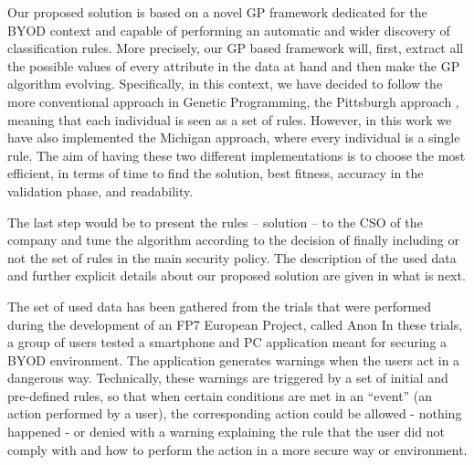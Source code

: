 \documentclass[runningheads]{llncs}
\begin{document}
Our proposed solution is based on a novel GP framework dedicated for
the BYOD context and capable of performing an automatic and wider
discovery of classification rules. More precisely, our GP based
framework will, first, extract all the possible values of every
attribute in the data at hand and then make the GP algorithm evolving.
Specifically, in this context, we have decided to follow the more
conventional approach in Genetic Programming, the Pittsburgh approach
\cite{freitas2002data}, meaning that each individual is seen as a set
of rules. However, in this work we have also implemented the Michigan
approach, where every individual is a single rule. The aim of having
these two different implementations is to choose the most efficient,
in terms of time to find the solution, best fitness, accuracy in the
validation phase, and readability.

The last step would be to present the rules -- solution -- to the CSO of the company and tune the algorithm according to the decision of
finally including or not the set of rules in the main security
policy. The description of the used data and further explicit details
about our proposed solution are given in what is next.

\label{subsec:data}

 The set of used data has been gathered from the trials that were performed
during the development of an FP7 European Project, called Anon
In these trials, a group of
 users tested a smartphone and PC application meant for securing a
 BYOD environment. The application generates warnings when the users
 act in a dangerous way. Technically, these warnings are triggered by
 a set of initial and pre-defined rules, so that when certain
 conditions are met in an ``event'' (an action performed by a user),
 the corresponding action could be allowed - nothing happened - or
 denied with a warning explaining the rule that the user did not comply with and how to perform the action in a more secure way or environment.
\end{document}
